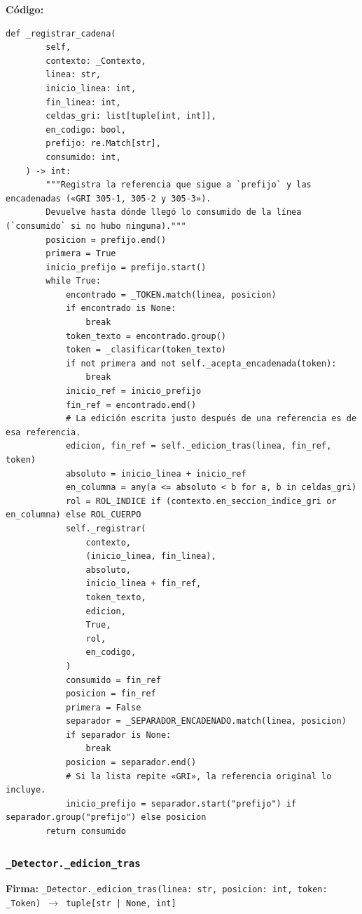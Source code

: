 \documentclass[11pt,a4paper]{article}
\begin{document}
\textbf{Código:}
\begin{lstlisting}
def _registrar_cadena(
        self,
        contexto: _Contexto,
        linea: str,
        inicio_linea: int,
        fin_linea: int,
        celdas_gri: list[tuple[int, int]],
        en_codigo: bool,
        prefijo: re.Match[str],
        consumido: int,
    ) -> int:
        """Registra la referencia que sigue a `prefijo` y las encadenadas («GRI 305-1, 305-2 y 305-3»).
        Devuelve hasta dónde llegó lo consumido de la línea (`consumido` si no hubo ninguna)."""
        posicion = prefijo.end()
        primera = True
        inicio_prefijo = prefijo.start()
        while True:
            encontrado = _TOKEN.match(linea, posicion)
            if encontrado is None:
                break
            token_texto = encontrado.group()
            token = _clasificar(token_texto)
            if not primera and not self._acepta_encadenada(token):
                break
            inicio_ref = inicio_prefijo
            fin_ref = encontrado.end()
            # La edición escrita justo después de una referencia es de esa referencia.
            edicion, fin_ref = self._edicion_tras(linea, fin_ref, token)
            absoluto = inicio_linea + inicio_ref
            en_columna = any(a <= absoluto < b for a, b in celdas_gri)
            rol = ROL_INDICE if (contexto.en_seccion_indice_gri or en_columna) else ROL_CUERPO
            self._registrar(
                contexto,
                (inicio_linea, fin_linea),
                absoluto,
                inicio_linea + fin_ref,
                token_texto,
                edicion,
                True,
                rol,
                en_codigo,
            )
            consumido = fin_ref
            posicion = fin_ref
            primera = False
            separador = _SEPARADOR_ENCADENADO.match(linea, posicion)
            if separador is None:
                break
            posicion = separador.end()
            # Si la lista repite «GRI», la referencia original lo incluye.
            inicio_prefijo = separador.start("prefijo") if separador.group("prefijo") else posicion
        return consumido
\end{lstlisting}

\subsubsection*{\texttt{\_Detector.\_edicion\_tras}}
\textbf{Firma:} \texttt{\_Detector.\_edicion\_tras(linea: str, posicion: int, token: \_Token) $\rightarrow$ tuple[str | None, int]}
\end{document}
